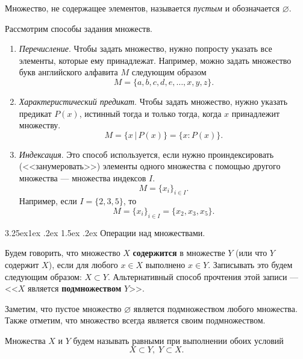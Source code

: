 \documentclass[12pt, russian]{article}
\makeatletter
\renewcommand\subsubsection{\@startsection{subsubsection}{3}{\parindent}%
	{3.25ex\@plus 1ex \@minus .2ex}%
	{1.5ex \@plus .2ex}%
	{\normalfont\large\bfseries}}
\makeatother
\begin{document}
Множество, не содержащее элементов, называется \textit{пустым} и обозначается $\varnothing$.

Рассмотрим способы задания множеств.

\begin{enumerate}
	\item \textit{Перечисление}. Чтобы задать множество, нужно попросту указать все элементы, которые ему принадлежат. Например, можно задать множество букв английского алфавита $M$ следующим образом
	$$
	M = \{ a, b, c, d, e, \ldots, x, y, z \}.
	$$

	\item \textit{Характеристический предикат}. Чтобы задать множество, нужно указать предикат $P(x)$, истинный тогда и только тогда, когда $x$ принадлежит множеству.
	$$
	M = \{ x \, | \,  P(x)\} = \{ x: P(x)\}.
	$$

	\item \textit{Индексация}. Это способ используется, если нужно проиндексировать (<<занумеровать>>) элементы одного множества с помощью другого множества --- множества индексов $I$. 
	$$
	M = \{ x_i \}_{i \in I}.
	$$
	Например, если $I=\{2,3,5\}$, то
	$$
	M = \{ x_i \}_{i \in I} = \{ x_2, x_3, x_5 \}.
	$$
\end{enumerate}




\subsubsection{Операции над множествами.}

Будем говорить, что множество $X$ \textbf{содержится} в множестве $Y$ (или что $Y$ содержит $X$), если для любого $x \in X$ выполнено $x \in Y$. Записывать это будем следующим образом: $X \subset Y$. Альтернативный способ прочтения этой записи --- <<$X$ является \textbf{подмножеством} $Y$>>.

Заметим, что пустое множество $\varnothing$ является подмножеством любого множества. Также отметим, что множество всегда является своим подмножеством.

Множества $X$ и $Y$ будем называть равными при выполнении обоих условий
$$
X \subset Y, \; Y \subset X.
$$
\end{document}

